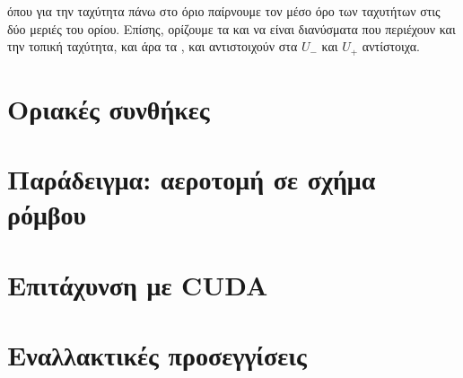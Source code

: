όπου για την ταχύτητα πάνω στο όριο παίρνουμε τον μέσο όρο των ταχυτήτων στις δύο μεριές του ορίου.
Επίσης, ορίζουμε τα  και  να είναι διανύσματα που περιέχουν και την τοπική ταχύτητα, και άρα τα , και  αντιστοιχούν στα $U_{-}$ και $U_{+}$ αντίστοιχα.

\section{Οριακές συνθήκες}
\label{section:shockwave-bcs}


\section{Παράδειγμα: αεροτομή σε σχήμα ρόμβου}


\section{Επιτάχυνση με CUDA}


\section{Εναλλακτικές προσεγγίσεις}




